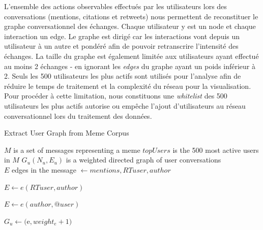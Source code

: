     L'ensemble des actions observables effectués par les utilisateurs lors des conversations (mentions, citations et retweets) nous permettent de reconstituer le graphe conversationnel des échanges. Chaque utilisateur y est un node et chaque interaction un edge. Le graphe est dirigé car les interactions vont depuis un utilisateur à un autre et pondéré afin de pouvoir retranscrire l'intensité des échanges. La taille du graphe est également limitée aux utilisateurs ayant effectué au moins 2 échanges - en ignorant les \textit{edges} du graphe ayant un poids inférieur à 2. Seuls les 500 utilisateurs les plus actifs sont utilisés pour l'analyse afin de réduire le temps de traitement et la complexité du réseau pour la visualisation. Pour procéder à cette limitation, nous constituons une \textit{whitelist} des 500 utilisateurs les plus actifs autorise ou empêche l'ajout d'utilisateurs au réseau conversationnel lors du traitement des données.

    \begin{algorithm}[h]
        \caption{Extract User Graph from Meme Corpus}
        \label{algo:meme-user-graph}
        \begin{algorithmic}
            \Require $M$ is a set of messages representing a meme
            \State $topUsers$ is the 500 most active users in $M$
            \State $G_u(N_u,E_u)$ is a weighted directed graph of user conversations
            \\
                    \State $E$ edges in the message
                    \State {}  $ \gets mentions, RTuser, author$
                    

                            \State $E \gets e(RTuser, author)$    
                        \EndIf

                            \State $E \gets e(author, @user)$    
                        \EndFor
                        
                            \State $G_u \gets ($e$,weight_e+1)$
                        \EndFor

                    \EndIf

                \EndFor
            \EndFunction
        \end{algorithmic}
    \end{algorithm}


